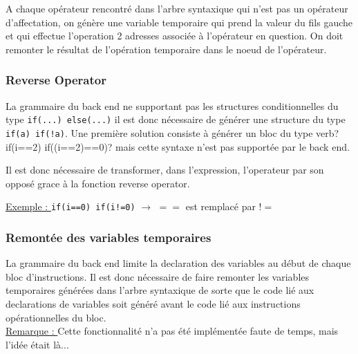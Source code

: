A chaque opérateur rencontré dans l'arbre syntaxique qui n'est pas un opérateur d'affectation, on génère une variable temporaire qui prend la valeur du fils gauche et qui effectue l'operation 2 adresses associée à l'opérateur en question. On doit remonter le résultat de l'opération temporaire dans le noeud de l'opérateur.

\begin{center}
\end{center}

\subsubsection{Reverse Operator}

La grammaire du back end ne supportant pas les structures conditionnelles du type \verb?if(...) else(...)? il est donc nécessaire de générer une structure du type \verb?if(a) if(!a)?. Une première solution consiste à générer un bloc du type verb?if(i==2) if((i==2)==0)? mais cette syntaxe n'est pas supportée par le back end.

Il est donc nécessaire de transformer, dans l'expression, l'operateur par son opposé grace à la fonction reverse operator.

\underline{Exemple : } \verb?if(i==0) if(i!=0)? $\longrightarrow$ $==$ est remplacé par $!=$

\subsubsection{Remontée des variables temporaires}

La grammaire du back end limite la declaration des variables au début de chaque bloc d'instructions. Il est donc nécessaire de faire remonter les variables temporaires générées dans l'arbre syntaxique de sorte que le code lié aux declarations de variables soit généré avant le code lié aux instructions opérationnelles du bloc.\\

\underline{Remarque : } Cette fonctionnalité n'a pas été implémentée faute de temps, mais l'idée était là...

